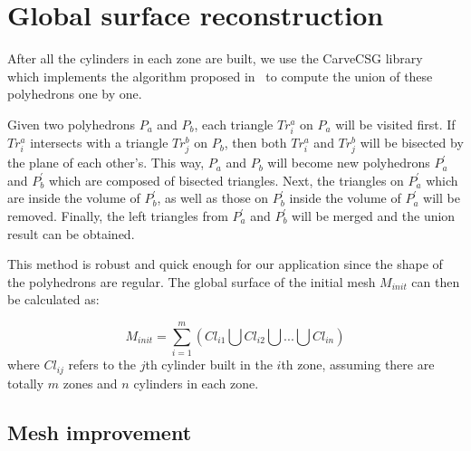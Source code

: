 \section{Global surface reconstruction} \label{ch4:sec:algo:global}


After all the cylinders in each zone are built, we use the
CarveCSG library~\cite{CarveCSG} which implements the algorithm proposed
in~\cite{LTH86} to compute the union of these polyhedrons one by one.

Given two polyhedrons $P_a$ and $P_b$, each triangle $Tr^a_i$ on $P_a$ will be
visited first. If $Tr^a_i$ intersects with a triangle $Tr^b_j$ on $P_b$, then
both $Tr^a_i$ and $Tr^b_j$ will be bisected by the plane of each other's.
This way, $P_a$ and $P_b$ will become new polyhedrons $P^\prime_a$ and
$P^\prime_b$ which are composed of bisected triangles. Next, the triangles on
$P^\prime_a$ which are inside the volume of $P^\prime_b$, as well as
those on $P^\prime_b$ inside the volume of $P^\prime_a$ will be removed.
Finally, the left triangles from $P^\prime_a$ and $P^\prime_b$ will
be merged and the union result can be obtained.

This method is robust and quick enough for our application since the shape
of the polyhedrons are regular. The global surface of the initial mesh
$M_{init}$ can then be calculated as:


\begin{equation}
\label{eq:surfreconstortho}
    M_{init}=\sum\limits_{i=1}^m {(Cl_{i1} \bigcup Cl_{i2} \bigcup {...} \bigcup Cl_{in})}
\end{equation}
where $Cl_{ij}$ refers to the $j$th cylinder built in  the $i$th
zone, assuming there are totally $m$ zones and $n$ cylinders in each
zone.

\subsection{Mesh improvement}
\label{ch4:sec:algo:global:improve}

